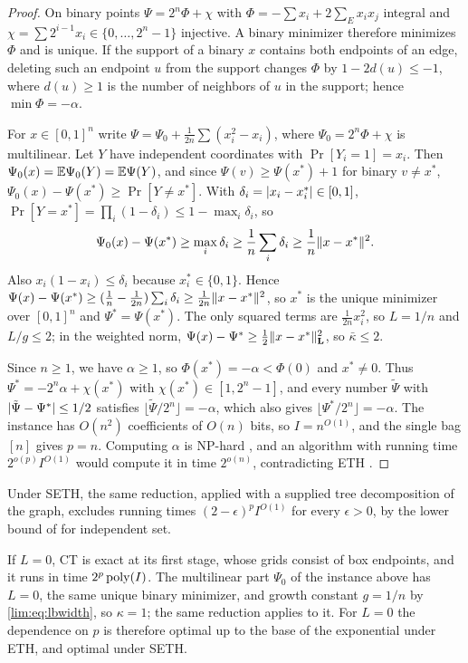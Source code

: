 \begin{proof}
On binary points $\Psi=2^n\Phi+\chi$ with $\Phi=-\sum x_i+2\sum_Ex_ix_j$
integral and $\chi=\sum2^{i-1}x_i\in\{0,\dots,2^n-1\}$ injective. A binary
minimizer therefore minimizes $\Phi$ and is unique. If the support of a
binary $x$ contains both endpoints of an edge, deleting such an endpoint $u$
from the support changes $\Phi$ by $1-2d(u)\le-1$, where $d(u)\ge1$ is the
number of neighbors of $u$ in the support; hence $\min\Phi=-\alpha$.

For $x\in[0,1]^n$ write $\Psi=\Psi_0+\frac1{2n}\sum(x_i^2-x_i)$, where
$\Psi_0=2^n\Phi+\chi$ is multilinear. Let $Y$ have independent coordinates
with $\Pr[Y_i=1]=x_i$. Then $\Psi_0(x)=\mathbb E\Psi_0(Y)=\mathbb E\Psi(Y)$, and since
$\Psi(v)\ge\Psi(x^*)+1$ for binary $v\ne x^*$,
$\Psi_0(x)-\Psi(x^*)\ge\Pr[Y\ne x^*]$. With
$\delta_i=\lvert x_i-x_i^*\rvert\in[0,1]$,
$\Pr[Y=x^*]=\prod_i(1-\delta_i)\le1-\max_i\delta_i$, so
\begin{equation}\label{lim:eq:lbwidth}
\Psi_0(x)-\Psi(x^*)\ge\max_i\delta_i\ge\frac1n\sum_i\delta_i
\ge\frac1n\lVert x-x^*\rVert^2 .
\end{equation}
Also $x_i(1-x_i)\le\delta_i$ because $x_i^*\in\{0,1\}$. Hence
$\Psi(x)-\Psi(x^*)\ge(\frac1n-\frac1{2n})\sum_i\delta_i\ge\frac1{2n}\lVert x-x^*\rVert^2$,
so $x^*$ is the unique minimizer over $[0,1]^n$ and $\Psi^*=\Psi(x^*)$. The
only squared terms are $\frac1{2n}x_i^2$, so $L=1/n$ and $L/g\le2$; in the
weighted norm, $\Psi(x)-\Psi^*\ge\frac12\lVert x-x^*\rVert_{\mathbf L}^2$, so
$\bar\kappa\le2$.

Since $n\ge1$, we have $\alpha\ge1$, so $\Phi(x^*)=-\alpha<\Phi(0)$ and
$x^*\ne0$. Thus $\Psi^*=-2^n\alpha+\chi(x^*)$ with
$\chi(x^*)\in[1,2^n-1]$, and every
number $\tilde\Psi$ with $\lvert \tilde\Psi-\Psi^*\rvert\le1/2$ satisfies
$\lfloor\tilde\Psi/2^n\rfloor=-\alpha$, which
also gives $\lfloor\Psi^*/2^n\rfloor=-\alpha$. The instance has $O(n^2)$
coefficients of $O(n)$ bits, so $I=n^{O(1)}$, and the single bag $[n]$ gives
$p=n$. Computing $\alpha$ is NP-hard \cite{GareyJohnson1979}, and an
algorithm with running time $2^{o(p)}I^{O(1)}$ would compute it in time
$2^{o(n)}$, contradicting ETH \cite{ImpagliazzoPaturiZane2001}.
\end{proof}

Under SETH, the same reduction, applied with a supplied tree decomposition
of the graph, excludes running times $(2-\epsilon)^pI^{O(1)}$ for every
$\epsilon>0$, by the lower bound of \cite{LokshtanovMarxSaurabh2018} for
independent set.

If $L=0$, CT is exact at its first stage, whose grids consist of box
endpoints, and it runs in time $2^p\operatorname{poly}(I)$. The multilinear part $\Psi_0$
of the instance above has $L=0$, the same unique binary minimizer, and growth
constant $g=1/n$ by \eqref{lim:eq:lbwidth}, so $\kappa=1$; the same reduction
applies to it. For $L=0$ the dependence on $p$ is therefore optimal up to the
base of the exponential under ETH, and optimal under SETH.

